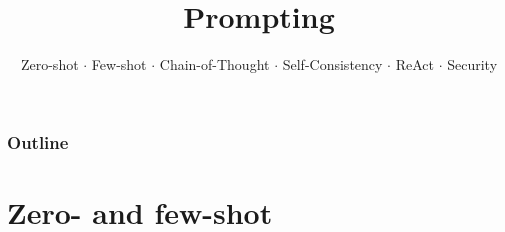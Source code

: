 \documentclass[aspectratio=169]{beamer}
\title{Prompting}
\subtitle{Zero-shot $\cdot$ Few-shot $\cdot$ Chain-of-Thought $\cdot$ Self-Consistency $\cdot$ ReAct $\cdot$ Security}
\date{}
\begin{document}
\begin{frame}
\titlepage
\end{frame}

\begin{frame}
\frametitle{Outline}
\tableofcontents
\end{frame}

\section{Zero- and few-shot}
\end{document}
